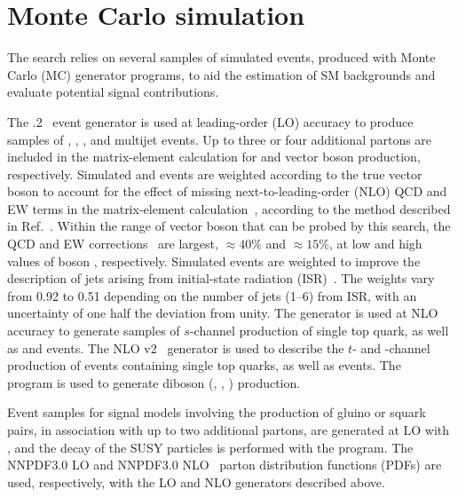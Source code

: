 \section{Monte Carlo simulation}
\label{sec:simulation}

The search relies on several samples of simulated events, produced
with Monte Carlo (MC) generator programs, to aid the estimation of SM
backgrounds and evaluate potential signal contributions.

The .2~\cite{Alwall2014} event generator is used at
leading-order (LO) accuracy to produce samples of \wj, \zj, \ttbar,
and multijet events. Up to three or four additional partons are
included in the matrix-element calculation for \ttbar and vector boson
production, respectively. Simulated \wj and \zj events are weighted
according to the true vector boson \pt to account for the effect of
missing next-to-leading-order (NLO) QCD and EW terms in the
matrix-element calculation~\cite{Alwall2014, Kuhn:2005gv}, according
to the method described in Ref.~\cite{Khachatryan:2016mdm}. Within the
range of vector boson \pt that can be probed by this search, the QCD
and EW corrections~\cite{Kuhn:2005gv} are largest, ${\approx}40\%$ and
${\approx}15\%$, at low and high values of boson \pt,
respectively. Simulated \ttbar events are weighted to improve the
description of jets arising from initial-state radiation
(ISR)~\cite{Chatrchyan:2013xna}. The weights vary from 0.92 to 0.51
depending on the number of jets (1--6) from ISR, with an uncertainty
of one half the deviation from unity. The \MGvATNLO generator is used
at NLO accuracy to generate samples of $s$-channel production of
single top quark, as well as {\ttbar\PW} and {\ttbar\cPZ} events. The
NLO \POWHEG v2~\cite{powheg, powheg_top_Wt} generator is used to
describe the $t$- and \cPqt\PW-channel production of events containing
single top quarks, as well as {\ttbar\PH} events. The ~\cite{pythia} program is used to generate diboson (\PW\PW,
\PW\cPZ, \cPZ\cPZ) production.

Event samples for signal models involving the production of gluino or
squark pairs, in association with up to two additional partons, are
generated at LO with \MGvATNLO, and the decay of the SUSY particles is
performed with the \PYTHIA program. The \textsc{NNPDF}3.0 LO and
\textsc{NNPDF}3.0 NLO~\cite{nnpdf} parton distribution functions
(PDFs) are used, respectively, with the LO and NLO generators
described above.

